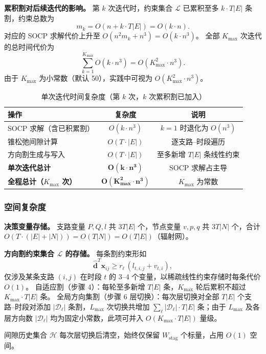 \documentclass[12pt,a4paper]{article}
\begin{document}
\textbf{累积割对后续迭代的影响。}
第 $k$ 次迭代时，约束集合 $\mathcal{L}$ 已累积至多 $k \cdot T|E|$ 条割，约束总数为
\[
m_k = O\!\left(n + k \cdot T|E|\right) = O(k \cdot n).
\]
对应的 SOCP 求解代价上升至 $O(n^2 m_k + n^3) = O(k \cdot n^3)$。
全部 $K_{\max}$ 次迭代的总时间代价为
\[
\sum_{k=1}^{K_{\max}} O(k \cdot n^3)
= O\!\left(K_{\max}^2 \cdot n^3\right).
\]
由于 $K_{\max}$ 为小常数（默认 50），实践中可视为 $O(K_{\max}^2 \cdot n^3)$。

\begin{table}[h]
\centering
\caption{单次迭代时间复杂度（第 $k$ 次，$k$ 次累积割已加入）}
\begin{tabular}{lcc}
\toprule
操作 & 复杂度 & 说明 \\
\midrule
SOCP 求解（含已积累割）& $O(k \cdot n^3)$ & $k=1$ 时退化为 $O(n^3)$ \\
锥松弛间隙计算 & $O(T \cdot |E|)$ & 逐支路--时段遍历 \\
方向割生成与写入 & $O(T \cdot |E|)$ & 至多新增 $T|E|$ 条线性约束 \\
\midrule
\textbf{单次迭代总计} & $\mathbf{O(k \cdot n^3)}$ & SOCP 求解占主导 \\
\textbf{全程总计（$K_{\max}$ 次）} & $\mathbf{O(K_{\max}^2 \cdot n^3)}$ & $K_{\max}$ 为常数 \\
\bottomrule
\end{tabular}
\end{table}

\subsubsection{空间复杂度}

\textbf{决策变量存储。}
支路变量 $P, Q, l$ 共 $3T|E|$ 个，节点变量 $v, p, q$ 共 $3T|N|$ 个，合计 $O(T \cdot (|E|+|N|)) = O(T|N|) = O(T|E|)$（辐射网）。

\textbf{方向割约束集合 $\mathcal{L}$ 的存储。}
每条割约束形如
\[
\hat{\mathbf{d}}^T \mathbf{x}_{ij} \geq r_\ell\,(l_{t,i,j}+v_{t,i}),
\]
仅涉及某条支路 $(i,j)$ 在时段 $t$ 的 3--4 个变量，以稀疏线性约束存储时每条代价 $O(1)$。
自适应割（步骤 4）：每轮至多新增 $T|E|$ 条，$K_{\max}$ 轮后累积不超过 $K_{\max} \cdot T|E|$ 条。
全局方向集割（步骤 6 层切换）：每次层切换对全部 $T|E|$ 个支路--时段对添加 $|\mathcal{D}_\ell|$ 条割，$L_{\max}$ 次切换共增加 $\sum_{\ell} |\mathcal{D}_\ell| \cdot T|E|$ 条；由于 $L_{\max}$ 及各层方向数 $|\mathcal{D}_\ell|$ 均为固定小常数，此项可并入 $O(K_{\max} \cdot T|E|)$ 量级。

间隙历史集合 $\mathcal{H}$ 每次层切换后清空，始终仅保留 $W_{\text{stag}}$ 个标量，占用 $O(1)$ 空间。
\end{document}
